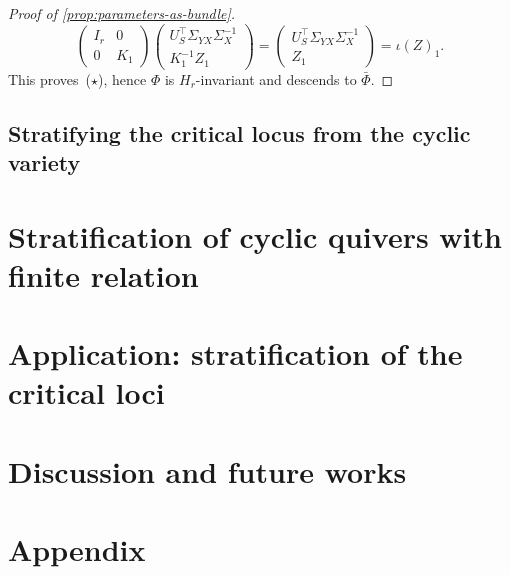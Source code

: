 \documentclass{article}
\theoremstyle{definition}
\begin{document}
\begin{proof}[Proof of \ref{prop:parameters-as-bundle}]
\[
\begin{pmatrix} I_r & 0 \\ 0 & K_1 \end{pmatrix}
\begin{pmatrix} U_S^\top \Sigma_{YX} \Sigma_X^{-1} \\ K_1^{-1} Z_1 \end{pmatrix}
= \begin{pmatrix} U_S^\top \Sigma_{YX} \Sigma_X^{-1} \\ Z_1 \end{pmatrix}
= \iota(Z)_1.
\]
This proves~($\star$), hence $\Phi$ is $H_{r}$-invariant and descends to $\bar\Phi$.
\end{proof}
\subsection{Stratifying the critical locus from the cyclic variety}

\section{Stratification of cyclic quivers with finite relation}

\section{Application: stratification of the critical loci}

\section{Discussion and future works}



\section*{Appendix}
\end{document}
